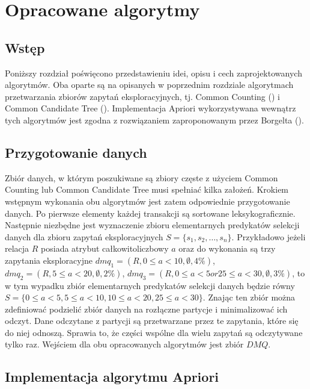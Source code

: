\chapter{Opracowane algorytmy}
\label{c4}

\section{Wstęp}
\label{c41}
Poniższy rozdział poświęcono przedstawieniu idei, opisu i cech zaprojektowanych algorytmów. Oba oparte są na opisanych w poprzednim rozdziale algorytmach przetwarzania zbiorów zapytań eksploracyjnych, tj. Common Counting (\cite{WojciechowskiCC}) i Common Candidate Tree (\cite{WojciechowskiCCT}). Implementacja Apriori wykorzystywana wewnątrz tych algorytmów jest zgodna z rozwiązaniem zaproponowanym przez Borgelta (\cite{Borgelt}). 

\section{Przygotowanie danych}
\label{c42}
Zbiór danych, w którym poszukiwane są zbiory częste z użyciem Common Counting lub Common Candidate Tree musi spełniać kilka założeń. Krokiem wstępnym wykonania obu algorytmów jest zatem odpowiednie przygotowanie danych. Po pierwsze elementy każdej transakcji są sortowane leksykograficznie. Następnie niezbędne jest wyznaczenie zbioru elementarnych predykatów selekcji danych dla zbioru zapytań eksploracyjnych \(S = \{s_1, s_2, \dots, s_n\}\). Przykładowo jeżeli relacja \(R\) posiada atrybut całkowitoliczbowy \(a\) oraz do wykonania są trzy zapytania eksploracyjne \(dmq_1=(R, 0 \leq a < 10, \emptyset, 4\%)\), \(dmq_2=(R, 5\leq a < 20, \emptyset, 2\%)\), \(dmq_3=(R, 0\leq a < 5 or 25\leq a < 30, \emptyset, 3\%)\), to w tym wypadku zbiór elementarnych predykatów selekcji danych będzie równy  \(S = \{0\leq a < 5, 5\leq a < 10, 10\leq a < 20, 25\leq a < 30\}\). Znając ten zbiór można zdefiniować podzielić zbiór danych na rozłączne partycje i minimalizować ich odczyt. Dane odczytane z partycji są przetwarzane przez te zapytania, które się do niej odnoszą. Sprawia to, że części wspólne dla wielu zapytań są odczytywane tylko raz. Wejściem dla obu opracowanych algorytmów jest zbiór \(DMQ\).

\section{Implementacja algorytmu Apriori}
\label{c43}

